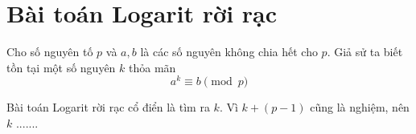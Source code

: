 \section{Bài toán Logarit rời rạc}

Cho số nguyên tố $p$ và $a,b$ là các số nguyên không chia hết cho $p$. Giả sử ta biết tồn tại một số nguyên $k$ thỏa mãn
$$a^k \equiv b \pmod{p}$$

Bài toán Logarit rời rạc cổ điển là tìm ra $k$. Vì $k+(p-1)$ cũng là nghiệm, nên $k$  .......